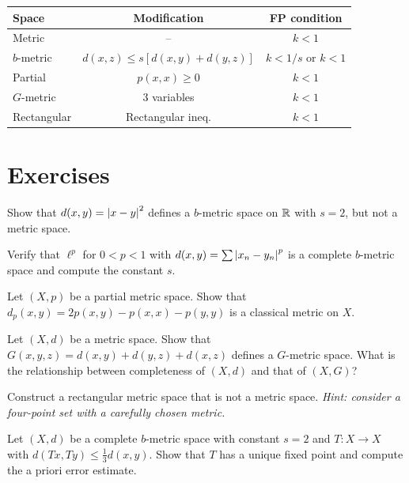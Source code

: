 \begin{keyformulas}[title=\textbf{Summary of generalized spaces}]
\begin{center}
\renewcommand{\arraystretch}{1.4}
\begin{tabular}{|l|c|c|}
\hline
\textbf{Space} & \textbf{Modification} & \textbf{FP condition} \\
\hline
Metric & -- & $k < 1$ \\
$b$-metric & $d(x,z) \leq s[d(x,y)+d(y,z)]$ & $k < 1/s$ or $k < 1$ \\
Partial & $p(x,x) \geq 0$ & $k < 1$ \\
$G$-metric & 3 variables & $k < 1$ \\
Rectangular & Rectangular ineq. & $k < 1$ \\
\hline
\end{tabular}
\end{center}
\end{keyformulas}

\section{Exercises}

\begin{exercise}
Show that $d(x,y) = \left| x - y \right|^2$ defines a $b$-metric space on $\mathbb{R}$ with
$s = 2$, but not a metric space.
\end{exercise}

\begin{exercise}
Verify that $\ell^p$ for $0 < p < 1$ with $d(x,y) = \sum \left| x_n - y_n \right|^p$ is
a complete $b$-metric space and compute the constant $s$.
\end{exercise}

\begin{exercise}
Let $(X, p)$ be a partial metric space. Show that
$d_p(x,y) = 2p(x,y) - p(x,x) - p(y,y)$ is a classical metric on $X$.
\end{exercise}

\begin{exercise}
Let $(X, d)$ be a metric space. Show that $G(x,y,z) = d(x,y) + d(y,z) + d(x,z)$
defines a $G$-metric space. What is the relationship between completeness of
$(X, d)$ and that of $(X, G)$?
\end{exercise}

\begin{exercise}
Construct a rectangular metric space that is not a metric space.
\textit{Hint: consider a four-point set with a carefully chosen metric.}
\end{exercise}

\begin{exercise}
Let $(X, d)$ be a complete $b$-metric space with constant $s = 2$ and
$T : X \to X$ with $d(Tx, Ty) \leq \frac{1}{3} d(x,y)$. Show that $T$ has a
unique fixed point and compute the a priori error estimate.
\end{exercise}

